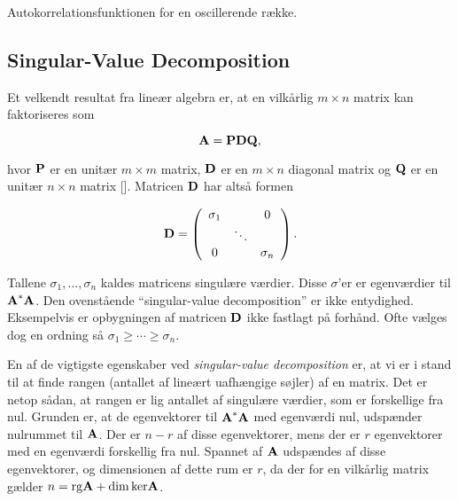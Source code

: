 \begin{description}
  {\caption{\protect\capsize
      Autokorrelationsfunktionen for en oscillerende
      r{\ae}kke.\label{tid:SinCorr}}}
\end{description} 

\subsection{Singular-Value Decomposition}
\label{tid:SVD}
Et velkendt resultat fra line{\ae}r algebra er, at en
vilk{\aa}rlig $m\times n$ matrix kan faktoriseres som

\[
\mbox{${\bf A}$} = \mbox{${\bf P}$}\mbox{${\bf D}$}\mbox{${\bf Q}$},
\]

hvor $\mbox{${\bf P}$}$ er en unit{\ae}r $m\times m$ matrix,
$\mbox{${\bf D}$}$ er en $m \times n$ diagonal matrix og
$\mbox{${\bf Q}$}$ er en unit{\ae}r $n \times n$ matrix
[]. Matricen $\mbox{${\bf D}$}$ har
alts{\aa} formen

\[
  \mbox{${\bf D}$} = \left( \begin{array}{ccc}
                \sigma_1 &  & 0 \\
                         & \ddots &  \\
                0        &  & \sigma_n  
             \end{array} \right).
\]

Tallene $\sigma_1, \ldots, \sigma_n$ kaldes matricens
singul{\ae}re v{\ae}rdier. Disse $\sigma$'er er
egen\-v{\ae}r\-dier til $\mbox{${\bf A}$}^*\mbox{${\bf A}$}$. Den
ovenst{\aa}ende ``singular-value decomposition'' er ikke
entydighed. Eksempelvis er opbygningen af matricen
$\mbox{${\bf D}$}$ ikke fastlagt p{\aa} forh{\aa}nd. Ofte
v{\ae}lges dog en ordning s{\aa} $\sigma_1 \ge \cdots \ge
\sigma_n$.

\vspace{4.0mm}
En af de vigtigste egenskaber ved {\em singular-value
decomposition} er, at vi er i stand til at finde rangen
(antallet af line{\ae}rt uafh{\ae}ngige s{\o}jler) af en
matrix. Det er netop s{\aa}dan, at rangen er lig antallet
af singul{\ae}re v{\ae}rdier, som er forskellige fra nul.
Grunden er, at de egenvektorer til $\mbox{${\bf A}$}^*\mbox{${\bf A}$}$
med egenv{\ae}rdi nul, udsp{\ae}nder nulrummet til
$\mbox{${\bf A}$}$. Der er $n-r$ af disse egenvektorer, mens der
er $r$ egenvektorer med en egenv{\ae}rdi forskellig fra
nul. Spannet af $\mbox{${\bf A}$}$ udsp{\ae}ndes af disse
egenvektorer, og dimensionen af dette rum er $r$, da der
for en vilk{\aa}rlig matrix g{\ae}lder $n={\rm
rg}\mbox{${\bf A}$}+{\rm dim}\, {\rm ker} \mbox{${\bf A}$}$.

